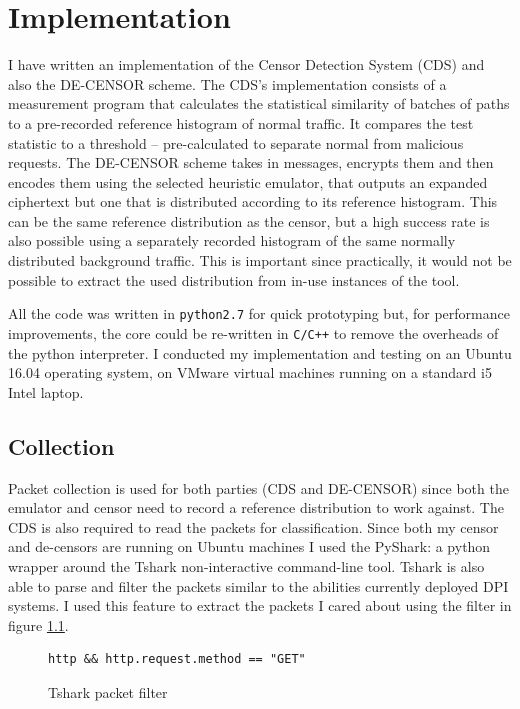 \documentclass[ %
                    author={Samuel Russell},
                supervisor={Prof. Bogdan Warinschi},
                    degree={MEng},
                     title={Innocuous Ciphertexts},
                  subtitle={The DE-CENSOR Scheme},
                      type={Research},
                      year={2018} ]{dissertation}
\begin{document}
\chapter{Implementation}

I have written an implementation of the Censor Detection System (CDS) and also the DE-CENSOR scheme.
The CDS's implementation consists of a measurement program that calculates the statistical similarity of batches of paths to a pre-recorded reference histogram of normal traffic.
It compares the test statistic to a threshold -- pre-calculated to separate normal from malicious requests.
The DE-CENSOR scheme takes in messages, encrypts them and then encodes them using the selected heuristic emulator, that outputs an expanded ciphertext but one that is distributed according to its reference histogram. This can be the same reference distribution as the censor, but a high success rate is also possible using a separately recorded histogram of the same normally distributed background traffic.
This is important since practically, it would not be possible to extract the used distribution from in-use instances of the tool.

All the code was written in \texttt{python2.7} for quick prototyping but, for performance improvements, the core could be re-written in \texttt{C/C++} to remove the overheads of the python interpreter. I conducted my implementation and testing on an Ubuntu 16.04 operating system, on VMware virtual machines running on a standard i5 Intel laptop.

\section{Collection}

Packet collection is used for both parties (CDS and DE-CENSOR) since both the emulator and censor need to record a reference distribution to work against. The CDS is also required to read the packets for classification. Since both my censor and de-censors are running on Ubuntu machines I used the PyShark: a python wrapper around the Tshark non-interactive command-line tool. Tshark is also able to parse and filter the packets similar to the abilities currently deployed DPI systems. I used this feature to extract the packets I cared about using the filter in figure \ref{fig:filter}.

\begin{figure}[h]
\begin{verbatim}
http && http.request.method == "GET"
\end{verbatim}
\caption{Tshark packet filter}
\label{fig:filter}
\end{figure}
\end{document}
